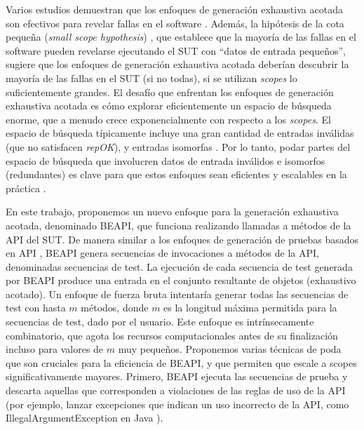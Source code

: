 Varios estudios demuestran que los enfoques de generación exhaustiva acotada son efectivos para revelar fallas en el software \cite{Marinov01, Khurshid01, Boyapati02, Sullivan04}. Además, la hipótesis de la cota pequeña (\textit{small scope hypothesis}) \cite{Andoni02}, que establece que la mayoría de las fallas en el software pueden revelarse ejecutando el SUT con “datos de entrada pequeños”, sugiere que los enfoques de generación exhaustiva acotada deberían descubrir la mayoría de las fallas en el SUT (si no todas), si se utilizan \textit{scopes} lo suficientemente grandes. El desafío que enfrentan los enfoques de generación exhaustiva acotada es cómo explorar eficientemente un espacio de búsqueda enorme, que a menudo crece exponencialmente con respecto a los \textit{scopes}. El espacio de búsqueda típicamente incluye una gran cantidad de entradas inválidas (que no satisfacen \textit{repOK}), y entradas isomorfas \cite{15, 28} . Por lo tanto, podar partes del espacio de búsqueda que involucren datos de entrada inválidos e isomorfos (redundantes) es clave para que estos enfoques sean eficientes y escalables en la práctica \cite{Boyapati02}.

En este trabajo, proponemos un nuevo enfoque para la generación exhaustiva acotada, denominado BEAPI, que funciona realizando llamadas a métodos de la API del SUT. De manera similar a los enfoques de generación de pruebas basados en API \cite{Pacheco07, Ma15,Fraser11}, BEAPI genera secuencias de invocaciones a métodos de la API, denominadas secuencias de test. La ejecución de cada secuencia de test generada por BEAPI produce una entrada en el conjunto resultante de objetos (exhaustivo acotado). 
Un enfoque de fuerza bruta intentaría generar todas las secuencias de test con hasta $m$ métodos, donde $m$ es la longitud máxima permitida para la secuencias de test, dado por el usuario. Este enfoque es intrínsecamente combinatorio, que agota los recursos computacionales antes de su finalización incluso para valores de $m$ muy pequeños. Proponemos varias técnicas de poda que son cruciales para la eficiencia de BEAPI, y que permiten que escale a scopes significativamente mayores. Primero, BEAPI ejecuta las secuencias de prueba y descarta aquellas que corresponden a violaciones de las reglas de uso de la API (por ejemplo, lanzar excepciones que indican un uso incorrecto de la API, como IllegalArgumentException en Java \cite{Liskov00, Pacheco07}). 

